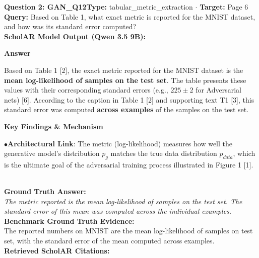 \documentclass[10pt,a4paper]{article}
\begin{document}
\begin{tcolorbox}[questionbox]
{\noindent\bfseries\large\color{navy} Question 2: GAN\_Q12}\hfill {\footnotesize\color{darkteal}\textbf{Type:} tabular\_metric\_extraction $\cdot$ \textbf{Target:} Page 6}\\[4pt]
{\noindent\bfseries\color{accentblue} Query: } Based on Table 1, what exact metric is reported for the MNIST dataset, and how was its standard error computed?\\[6pt]
{\noindent\bfseries\color{navy} ScholAR Model Output (Qwen 3.5 9B):}\\[2pt]
{\small \noindent \textbf{Answer}\par\vspace{3pt}Based on Table 1 [2], the exact metric reported for the MNIST dataset is the \textbf{mean log-likelihood of samples on the test set}. The table presents these values with their corresponding standard errors (e.g., $225 \pm 2$ for Adversarial nets) [6]. According to the caption in Table 1 [2] and supporting text T1 [3], this standard error was computed \textbf{across examples} of the samples on the test set.\par\vspace{3pt}\noindent \textbf{Key Findings \& Mechanism}\par\vspace{3pt}\noindent\hspace*{8pt}$\bullet$\hspace*{4pt}\textbf{Architectural Link}: The metric (log-likelihood) measures how well the generative model's distribution $p_g$ matches the true data distribution $p_{data}$, which is the ultimate goal of the adversarial training process illustrated in Figure 1 [1].}\\[6pt]
{\noindent\bfseries\color{darkteal} Ground Truth Answer:}\\[2pt]
{\small\itshape The metric reported is the mean log-likelihood of samples on the test set. The standard error of this mean was computed across the individual examples.}\\[4pt]
{\noindent\bfseries\color{darkteal} Benchmark Ground Truth Evidence:}\\[2pt]
{\footnotesize The reported numbers on MNIST are the mean log-likelihood of samples on test set, with the standard error of the mean computed across examples.}\\[4pt]
{\noindent\bfseries\color{navy} Retrieved ScholAR Citations:}\\[2pt]
\begin{itemize}\setlength\itemsep{1pt}

\end{itemize}
\end{tcolorbox}
\end{document}
